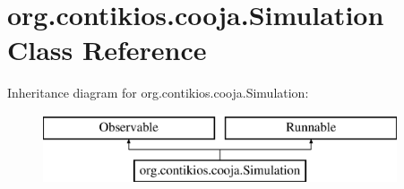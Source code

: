 \hypertarget{classorg_1_1contikios_1_1cooja_1_1Simulation}{\section{org.\-contikios.\-cooja.\-Simulation Class Reference}
\label{classorg_1_1contikios_1_1cooja_1_1Simulation}
}
Inheritance diagram for org.\-contikios.\-cooja.\-Simulation\-:\begin{figure}[H]
\begin{center}
\leavevmode
\includegraphics[height=2.000000cm]{classorg_1_1contikios_1_1cooja_1_1Simulation}
\end{center}
\end{figure}

